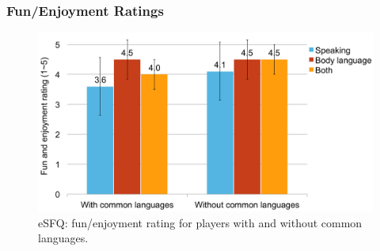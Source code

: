 

\subsubsection{Fun/Enjoyment Ratings}



\begin{figure}[!t]
\centering
\includegraphics[width=0.9\columnwidth]{Figures/US_Fun.pdf}
\caption{eSFQ: fun/enjoyment rating for players with and without common languages.}
\label{fig:US_Fun}
\end{figure}




